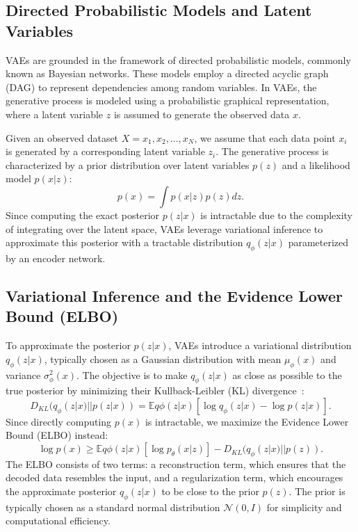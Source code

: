 \subsection{Directed Probabilistic Models and Latent Variables}

VAEs are grounded in the framework of directed probabilistic models, commonly known as Bayesian networks. These models employ a directed acyclic graph (DAG) to represent dependencies among random variables. In VAEs, the generative process is modeled using a probabilistic graphical representation, where a latent variable $z$ is assumed to generate the observed data $x$.

Given an observed dataset $X = {x_1, x_2, ..., x_N}$, we assume that each data point $x_i$ is generated by a corresponding latent variable $z_i$. The generative process is characterized by a prior distribution over latent variables $p(z)$ and a likelihood model $p(x|z)$:
\begin{equation}
p(x) = \int p(x|z) p(z) dz.
\end{equation}
Since computing the exact posterior $p(z|x)$ is intractable due to the complexity of integrating over the latent space, VAEs leverage variational inference to approximate this posterior with a tractable distribution $q_\phi(z|x)$ parameterized by an encoder network.

\subsection{Variational Inference and the Evidence Lower Bound (ELBO)}
To approximate the posterior $p(z|x)$, VAEs introduce a variational distribution $q_\phi(z|x)$, typically chosen as a Gaussian distribution with mean $\mu_\phi(x)$ and variance $\sigma^2_\phi(x)$. The objective is to make $q_\phi(z|x)$ as close as possible to the true posterior by minimizing their Kullback-Leibler (KL) divergence~\cite{stackexchange_kl_vae}:
\begin{equation}
D_{KL}(q_\phi(z|x) || p(z|x)) = \mathbb{E}{q\phi(z|x)}[\log q_\phi(z|x) - \log p(z|x)].
\end{equation}
Since directly computing $p(x)$ is intractable, we maximize the Evidence Lower Bound (ELBO) instead:
\begin{equation}
\log p(x) \geq \mathbb{E}{q\phi(z|x)}[\log p_\theta(x|z)] - D_{KL}(q_\phi(z|x) || p(z)).
\end{equation}
The ELBO consists of two terms: a reconstruction term, which ensures that the decoded data resembles the input, and a regularization term, which encourages the approximate posterior $q_\phi(z|x)$ to be close to the prior $p(z)$. The prior is typically chosen as a standard normal distribution $\mathcal{N}(0, I)$ for simplicity and computational efficiency.


